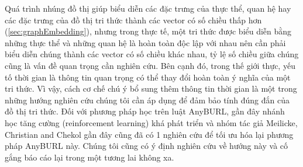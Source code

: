 Quá trình nhúng đồ thị giúp biểu diễn các đặc trưng của thực thể, quan hệ hay các đặc trưng của đồ thị tri thức thành các vector có số chiều thấp hơn (\autoref{sec:graphEmbedding}), nhưng trong thực tế, một tri thức được biểu diễn bằng những thực thể và những quan hệ là hoàn toàn độc lập với nhau nên cần phải biểu diễn chúng thành các vector có số chiều khác nhau, tỷ lệ số chiều giữa chúng cũng là vấn đề quan trọng cần nghiên cứu. Bên cạnh đó, trong thế giới thực, yếu tố thời gian là thông tin quan trọng có thể thay đổi hoàn toàn ý nghĩa của một tri thức. Vì vậy, cách cơ chế chú ý bổ sung thêm thông tin thời gian là một trong những hướng nghiên cứu chúng tôi cần áp dụng để đảm bảo tính đúng đắn của đồ thị tri thức. Đối với phương pháp học trên luật AnyBURL, gần đây nhánh học tăng cường (reinforcement learning) khá phát triển và nhóm tác giả Meilicke, Christian and Chekol \cite{meilicke2020reinforced} gần đây cũng đã có 1 nghiên cứu để tối ưu hóa lại phương pháp AnyBURL này.
Chúng tôi cũng có ý định nghiên cứu về hướng này và cố gắng báo cáo lại trong một tương lai không xa.